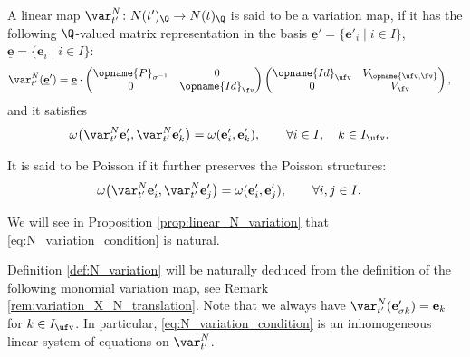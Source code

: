 \documentclass[pdftex]{sigma}
\newcommand{\Iufv}{I_{\ufv}}
\newcommand{\Id}{{\opname{Id}}}
\newcommand{\trans}{\opname{P}}
\newcommand{\ee}{\mathbf{e}}
\newcommand{\uee}{\underline{\ee}}
\newcommand{\high}{\opname{\ufv,\fv}}
\numberwithin{equation}{section}
\begin{document}
\begin{Definition}\label{def:N_variation}

A linear map $\var_{t'}^{N}\colon N(t')_{\Q}\rightarrow N(t)_{\Q}$ is said
to be a variation map, if it has the following $\Q$-valued matrix
representation in the basis $\uee'=\{\ee'_{i}\mid i\in I\}$, $\uee=\{\ee_{i}\mid i\in I\}$:
\begin{align}
\var_{t'}^{N}(\uee') & =\uee\cdot\begin{pmatrix}
\trans_{\sigma^{-1}} & 0\\
0 & \Id_{\fv}
\end{pmatrix}\begin{pmatrix}
\Id_{\ufv} & V_{\high}\\
0 & V_{\fv}
\end{pmatrix},\label{eq:N_variation_triangular}
\end{align}
and it satisfies
\begin{align}\label{eq:N_variation_condition}
\omega\big(\var_{t'}^{N}\ee'_{i},\var_{t'}^{N}\ee'_{k}\big) & =\omega(\ee'_{i},\ee'_{k}),\qquad \forall i\in I,\quad k\in\Iufv.
\end{align}

It is said to be Poisson if it further preserves the Poisson structures:
\begin{align*}
\omega\big(\var_{t'}^{N}\ee'_{i},\var_{t'}^{N}\ee'_{j}\big) & =\omega(\ee_{i}',\ee_{j}'),\qquad \forall i,j\in I.%
\end{align*}

\end{Definition}
We will see in Proposition \ref{prop:linear_N_variation} that
\eqref{eq:N_variation_condition} is natural.

Definition \ref{def:N_variation} will be naturally deduced from the definition of the following monomial variation map, see Remark \ref{rem:variation_X_N_translation}.
Note that we always have $\var_{t'}^{N}(\ee'_{\sigma k})=\ee_{k}$
for $k\in\Iufv$. In particular, \eqref{eq:N_variation_condition}
is an inhomogeneous linear system of equations on $\var_{t'}^{N}$.
\end{document}
